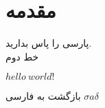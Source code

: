 \documentclass{article}
\begin{document}
\section{مقدمه}
پارسی را پاس بدارید.
\\
خط دوم
\newline

$
hello\ world!
$

بازگشت به فارسی
\newline
{}
$\sigma a \delta$
\end{document}
